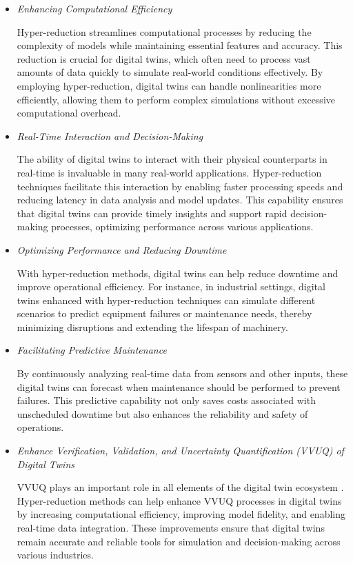 \documentclass[11pt]{article}
\begin{document}
\begin{itemize}
\item \textit{Enhancing Computational Efficiency}

Hyper-reduction streamlines computational processes by reducing the complexity of models while maintaining essential features and accuracy. This reduction is crucial for digital twins, which often need to process vast amounts of data quickly to simulate real-world conditions effectively. By employing hyper-reduction, digital twins can handle nonlinearities more efficiently, allowing them to perform complex simulations without excessive computational overhead.

\item \textit{Real-Time Interaction and Decision-Making}

The ability of digital twins to interact with their physical counterparts in real-time is invaluable in many real-world applications. Hyper-reduction techniques facilitate this interaction by enabling faster processing speeds and reducing latency in data analysis and model updates. This capability ensures that digital twins can provide timely insights and support rapid decision-making processes, optimizing performance across various applications.

\item \textit{Optimizing Performance and Reducing Downtime}

With hyper-reduction methods, digital twins can help reduce downtime and improve operational efficiency. For instance, in industrial settings, digital twins enhanced with hyper-reduction techniques can simulate different scenarios to predict equipment failures or maintenance needs, thereby minimizing disruptions and extending the lifespan of machinery.

\item \textit{Facilitating Predictive Maintenance}

By continuously analyzing real-time data from sensors and other inputs, these digital twins can forecast when maintenance should be performed to prevent failures. This predictive capability not only saves costs associated with unscheduled downtime but also enhances the reliability and safety of operations.

\item \textit{Enhance Verification, Validation, and Uncertainty Quantification (VVUQ) of Digital Twins}

VVUQ plays an important role in all elements of the digital twin ecosystem \cite{engineering2024foundational}. Hyper-reduction methods can help enhance VVUQ processes in digital twins by increasing computational efficiency, improving model fidelity, and enabling real-time data integration. These improvements ensure that digital twins remain accurate and reliable tools for simulation and decision-making across various industries.

\end{itemize}
\end{document}
